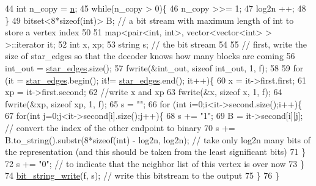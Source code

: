 \begin{DoxyCode}
44   \textcolor{keywordtype}{int} n\_copy = \hyperlink{classmarked__graph__compressed_a8d841016ddb11cfd33748c8deb6277ba}{n};
45   \textcolor{keywordflow}{while}(n\_copy > 0)\{
46     n\_copy >>= 1;
47     log2n ++;
48   \}
49   bitset<8*sizeof(int)> B; \textcolor{comment}{// a bit stream with maximum length of int to store a vertex index}
50 
51   map<pair<int, int>, vector<vector<int> > >::iterator it;
52   \textcolor{keywordtype}{int} x, xp;
53   \textcolor{keywordtype}{string} s; \textcolor{comment}{// the bit stream}
54 
55   \textcolor{comment}{// first, write the size of star\_edges so that the decoder knows how many blocks are coming}
56   int\_out = \hyperlink{classmarked__graph__compressed_a7df5779d313486644132bd816937f532}{star\_edges}.size();
57   fwrite(&int\_out, \textcolor{keyword}{sizeof} int\_out, 1, f);
58   
59   \textcolor{keywordflow}{for} (it = \hyperlink{classmarked__graph__compressed_a7df5779d313486644132bd816937f532}{star\_edges}.begin(); it!= \hyperlink{classmarked__graph__compressed_a7df5779d313486644132bd816937f532}{star\_edges}.end(); it++)\{
60     x = it->first.first;
61     xp = it->first.second;
62     \textcolor{comment}{//write x and xp}
63     fwrite(&x, \textcolor{keyword}{sizeof} x, 1, f);
64     fwrite(&xp, \textcolor{keyword}{sizeof} xp, 1, f);
65     s = \textcolor{stringliteral}{""};
66     \textcolor{keywordflow}{for} (\textcolor{keywordtype}{int} i=0;i<it->second.size();i++)\{
67       \textcolor{keywordflow}{for}(\textcolor{keywordtype}{int} j=0;j<it->second[i].size();j++)\{
68         s += \textcolor{stringliteral}{"1"};
69         B = it->second[i][j]; \textcolor{comment}{// convert the index of the other endpoint to binary}
70         s += B.to\_string().substr(8*\textcolor{keyword}{sizeof}(\textcolor{keywordtype}{int}) - log2n, log2n); \textcolor{comment}{// take only log2n many bits of the
       representation (and this should be taken from the least significant bits)}
71       \}
72       s += \textcolor{stringliteral}{"0"}; \textcolor{comment}{// to indicate that the neighbor list of this vertex is over now}
73     \}
74     \hyperlink{compression__helper_8cpp_accfebfd921b967c2f09e8c11569eb832}{bit\_string\_write}(f, s); \textcolor{comment}{// write this bitstream to the output}
75   \}
76 \}
\end{DoxyCode}
\mbox{\label{classmarked__graph__compressed_af58307bfadcaa4c3ca6dd594c2f9b3a9}} 
